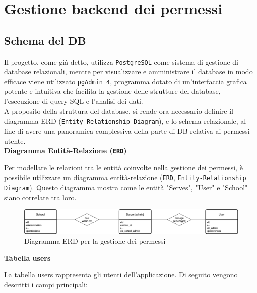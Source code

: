 \documentclass[a4paper, 12pt]{book}
\begin{document}
\newpage



\section{Gestione backend dei permessi}

\subsection{Schema del DB}

Il progetto, come già detto, utilizza \texttt{PostgreSQL} come sistema di gestione di database relazionali, mentre per
visualizzare e amministrare il database in modo efficace viene utilizzato \texttt{pgAdmin 4}, programma dotato
di un'interfaccia grafica potente e intuitiva che facilita la gestione delle strutture del database,
l'esecuzione di query SQL e l'analisi dei dati.\\

A proposito della struttura del database, si rende ora necessario definire il diagramma ERD (\texttt{Entity-Relationship Diagram}),
e lo schema relazionale, al fine di avere una panoramica complessiva della parte di DB relativa ai permessi utente.\\

\textbf{Diagramma Entità-Relazione (\texttt{ERD})}

Per modellare le relazioni tra le entità coinvolte nella gestione dei permessi, è possibile utilizzare
un diagramma entità-relazione (\texttt{ERD}, \texttt{Entity-Relationship Diagram}). Questo diagramma mostra come
le entità "Serves", "User" e "School" siano correlate tra loro.\\

\begin{figure}[H]
  \centering
  \includegraphics[width=\textwidth]{../images/diagramma-erd.png}
  \caption{Diagramma ERD per la gestione dei permessi}
\end{figure}

\textbf{Tabella users}

La tabella users rappresenta gli utenti dell'applicazione. Di seguito vengono descritti i campi principali:
\end{document}
